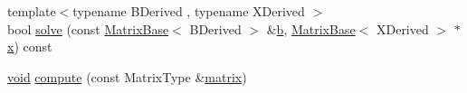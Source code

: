 \begin{DoxyCompactItemize}
\item 
{\footnotesize template$<$typename B\-Derived , typename X\-Derived $>$ }\\bool \hyperlink{class_sparse_l_u_3_01_matrix_type_00_01_umf_pack_01_4_a0c33d58a2dbd713e4ee3eae35f82f496}{solve} (const \hyperlink{class_matrix_base}{Matrix\-Base}$<$ B\-Derived $>$ \&\hyperlink{glext_8h_a6eba317e3cf44d6d26c04a5a8f197dcb}{b}, \hyperlink{class_matrix_base}{Matrix\-Base}$<$ X\-Derived $>$ $\ast$\hyperlink{glext_8h_a1db9d104e3c2128177f26aff7b46982f}{x}) const 
\item 
\hyperlink{group___u_a_v_objects_plugin_ga444cf2ff3f0ecbe028adce838d373f5c}{void} \hyperlink{class_sparse_l_u_3_01_matrix_type_00_01_umf_pack_01_4_ab774f608ee1e973e37bc5c090b90deaa}{compute} (const Matrix\-Type \&\hyperlink{glext_8h_a7b24a3f2f56eb1244ae69dacb4fecb6f}{matrix})
\end{DoxyCompactItemize}

